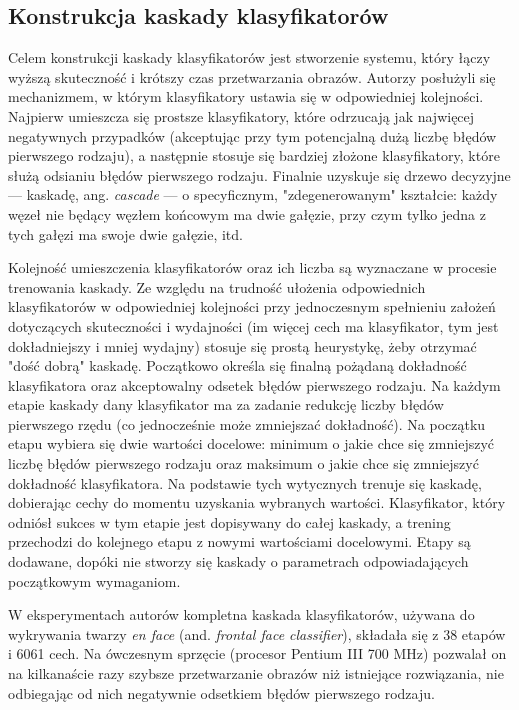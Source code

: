 \documentclass[12pt,a4paper,leqno,oneside,titlepage]{book}
\begin{document}
\subsection{Konstrukcja kaskady klasyfikatorów}

Celem konstrukcji kaskady klasyfikatorów jest stworzenie systemu, który łączy wyższą skuteczność i krótszy czas przetwarzania obrazów. Autorzy posłużyli się mechanizmem, w którym klasyfikatory ustawia się w odpowiedniej kolejności. Najpierw umieszcza się prostsze klasyfikatory, które odrzucają jak najwięcej negatywnych przypadków (akceptując przy tym potencjalną dużą liczbę błędów pierwszego rodzaju), a następnie stosuje się bardziej złożone klasyfikatory, które służą odsianiu błędów pierwszego rodzaju. Finalnie uzyskuje się drzewo decyzyjne — kaskadę, ang. \textit{cascade} — o specyficznym, "zdegenerowanym" kształcie: każdy węzeł nie będący węzłem końcowym ma dwie gałęzie, przy czym tylko jedna z tych gałęzi ma swoje dwie gałęzie, itd.

Kolejność umieszczenia klasyfikatorów oraz ich liczba są wyznaczane w procesie trenowania kaskady. Ze względu na trudność ułożenia odpowiednich klasyfikatorów w odpowiedniej kolejności przy jednoczesnym spełnieniu założeń dotyczących skuteczności i wydajności (im więcej cech ma klasyfikator, tym jest dokładniejszy i mniej wydajny) stosuje się prostą heurystykę, żeby otrzymać "dość dobrą" kaskadę. Początkowo określa się finalną pożądaną dokładność klasyfikatora oraz akceptowalny odsetek błędów pierwszego rodzaju. Na każdym etapie kaskady dany klasyfikator ma za zadanie redukcję liczby błędów pierwszego rzędu (co jednocześnie może zmniejszać dokładność). Na początku etapu wybiera się dwie wartości docelowe: minimum o jakie chce się zmniejszyć liczbę błędów pierwszego rodzaju oraz maksimum o jakie chce się zmniejszyć dokładność klasyfikatora. Na podstawie tych wytycznych trenuje się kaskadę, dobierając cechy do momentu uzyskania wybranych wartości. Klasyfikator, który odniósł sukces w tym etapie jest dopisywany do całej kaskady, a trening przechodzi do kolejnego etapu z nowymi wartościami docelowymi. Etapy są dodawane, dopóki nie stworzy się kaskady o parametrach odpowiadających początkowym wymaganiom.

W eksperymentach autorów kompletna kaskada klasyfikatorów, używana do wykrywania twarzy \textit{en face} (and. \textit{frontal face classifier}), składała się z 38 etapów i 6061 cech. Na ówczesnym sprzęcie (procesor Pentium III 700 MHz) pozwalał on na kilkanaście razy szybsze przetwarzanie obrazów niż istniejące rozwiązania, nie odbiegając od nich negatywnie odsetkiem błędów pierwszego rodzaju.\cite{ViolaJones01}
\end{document}
